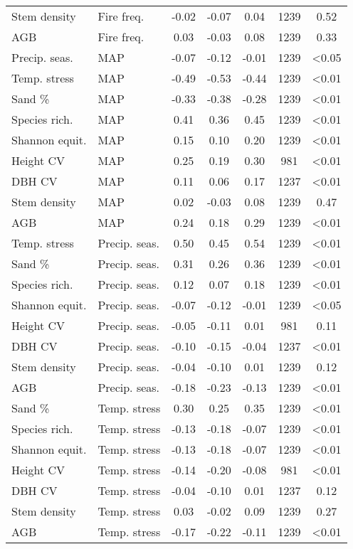 \begin{longtable}{llS[table-format=-1.2]S[table-format=-1.2]S[table-format=-1.2]S[table-format=4.0]S[table-format=<1.2]}
Stem density & Fire freq. & -0.02 & -0.07 & 0.04 & 1239 & 0.52 \\ 
AGB & Fire freq. & 0.03 & -0.03 & 0.08 & 1239 & 0.33 \\ 
Precip. seas. & MAP & -0.07 & -0.12 & -0.01 & 1239 & <0.05 \\ 
Temp. stress & MAP & -0.49 & -0.53 & -0.44 & 1239 & <0.01 \\ 
Sand \% & MAP & -0.33 & -0.38 & -0.28 & 1239 & <0.01 \\ 
Species rich. & MAP & 0.41 & 0.36 & 0.45 & 1239 & <0.01 \\ 
Shannon equit. & MAP & 0.15 & 0.10 & 0.20 & 1239 & <0.01 \\ 
Height CV & MAP & 0.25 & 0.19 & 0.30 & 981 & <0.01 \\ 
DBH CV & MAP & 0.11 & 0.06 & 0.17 & 1237 & <0.01 \\ 
Stem density & MAP & 0.02 & -0.03 & 0.08 & 1239 & 0.47 \\ 
AGB & MAP & 0.24 & 0.18 & 0.29 & 1239 & <0.01 \\ 
Temp. stress & Precip. seas. & 0.50 & 0.45 & 0.54 & 1239 & <0.01 \\ 
Sand \% & Precip. seas. & 0.31 & 0.26 & 0.36 & 1239 & <0.01 \\ 
Species rich. & Precip. seas. & 0.12 & 0.07 & 0.18 & 1239 & <0.01 \\ 
Shannon equit. & Precip. seas. & -0.07 & -0.12 & -0.01 & 1239 & <0.05 \\ 
Height CV & Precip. seas. & -0.05 & -0.11 & 0.01 & 981 & 0.11 \\ 
DBH CV & Precip. seas. & -0.10 & -0.15 & -0.04 & 1237 & <0.01 \\ 
Stem density & Precip. seas. & -0.04 & -0.10 & 0.01 & 1239 & 0.12 \\ 
AGB & Precip. seas. & -0.18 & -0.23 & -0.13 & 1239 & <0.01 \\ 
Sand \% & Temp. stress & 0.30 & 0.25 & 0.35 & 1239 & <0.01 \\ 
Species rich. & Temp. stress & -0.13 & -0.18 & -0.07 & 1239 & <0.01 \\ 
Shannon equit. & Temp. stress & -0.13 & -0.18 & -0.07 & 1239 & <0.01 \\ 
Height CV & Temp. stress & -0.14 & -0.20 & -0.08 & 981 & <0.01 \\ 
DBH CV & Temp. stress & -0.04 & -0.10 & 0.01 & 1237 & 0.12 \\ 
Stem density & Temp. stress & 0.03 & -0.02 & 0.09 & 1239 & 0.27 \\ 
AGB & Temp. stress & -0.17 & -0.22 & -0.11 & 1239 & <0.01 \\ 

\end{longtable}
